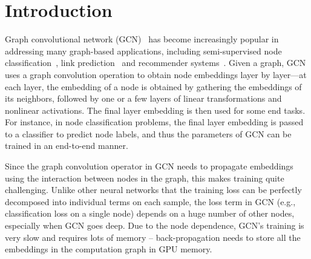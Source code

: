 \documentclass[sigconf]{acmart}
\begin{document}
\section{Introduction}
\label{sec:intro}

Graph convolutional network (GCN)~\cite{kipf2017semi} has become increasingly popular in addressing many graph-based applications, including semi-supervised node classification~\cite{kipf2017semi}, link prediction~\cite{zhang2018link} and recommender systems~\cite{Ying:2018}. 
Given a graph, GCN uses a graph convolution operation to obtain node embeddings layer by layer---at each layer, the embedding of a node is obtained by gathering the embeddings of its neighbors, followed by one or a few layers of linear transformations and nonlinear activations. The final layer embedding is then used for some end tasks. For instance, in node classification problems, the final layer embedding is passed to a classifier to predict node labels, and thus the parameters of GCN can be trained in an end-to-end manner. 


Since the graph convolution operator in GCN needs to propagate embeddings using the interaction between nodes in the graph, this makes training quite challenging. Unlike other neural networks that the training loss can be perfectly decomposed into individual terms on each sample, the loss term in GCN (e.g., classification loss on a single node)  depends on a huge number of other nodes, especially when GCN goes deep. Due to the node dependence, GCN's training is very slow and requires lots of memory -- back-propagation needs to store all the embeddings in the computation graph in GPU memory.
\end{document}
